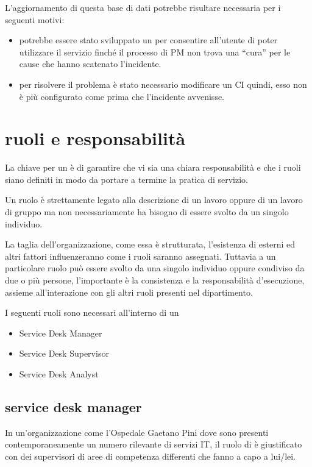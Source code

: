 L'aggiornamento di questa base di dati potrebbe risultare necessaria per i seguenti motivi:

\begin{itemize}
\item{potrebbe essere stato sviluppato un  per consentire all'utente di poter utilizzare il servizio finché il processo di \ac{PM} non trova una ``cura'' per le cause che hanno scatenato l'incidente.}
\item{per risolvere il problema è stato necessario modificare un \ac{CI} quindi, esso non è più configurato come prima che l'incidente avvenisse.}
\end{itemize}


\section[Ruoli e responsabilità]{ruoli e responsabilità}
\label{sd-roles-responsabilities}
La chiave per un   è di garantire che vi sia una chiara responsabilità e che i ruoli siano definiti in modo da portare a termine la pratica di servizio. 

Un ruolo è strettamente legato alla descrizione di un lavoro oppure di un lavoro di gruppo ma non necessariamente ha bisogno di essere svolto da un singolo individuo.

La taglia dell'organizzazione, come essa è strutturata, l'esistenza di  esterni ed altri fattori influenzeranno come i ruoli saranno assegnati. Tuttavia a un particolare ruolo può essere svolto da una singolo individuo oppure condiviso da due o più persone, l'importante è la consistenza e la responsabilità d'esecuzione, assieme all'interazione con gli altri ruoli presenti nel dipartimento.

I seguenti ruoli sono necessari all'interno di un 

\begin{itemize}
\item{Service Desk Manager}
\item{Service Desk Supervisor}
\item{Service Desk Analyst}
\end{itemize}

\subsection[Service Desk Manager]{service desk manager}
\label{sd-sd-manger}
In un'organizzazione come l'Ospedale Gaetano Pini dove sono presenti contemporaneamente un numero rilevante di servizi \acs{IT}, il ruolo di  è giustificato con dei supervisori di aree di competenza differenti che fanno a capo a lui/lei.

